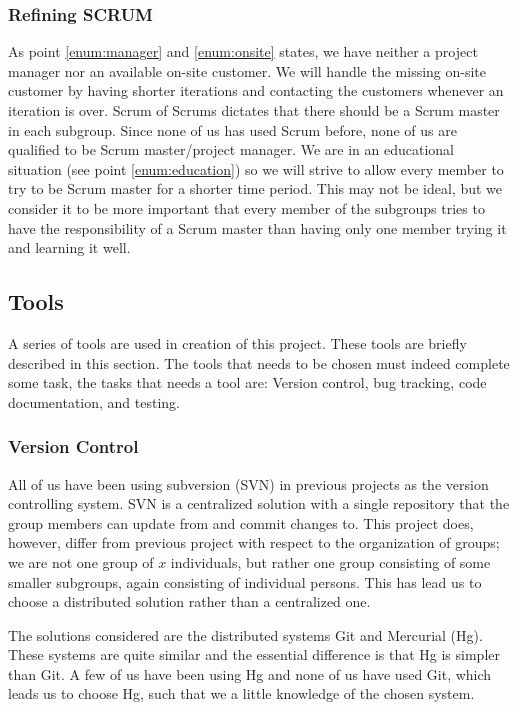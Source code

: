 \subsubsection{Refining SCRUM}
As point \ref{enum:manager} and \ref{enum:onsite} states, we have neither a project manager nor an available on-site customer.
We will handle the missing on-site customer by having shorter iterations and contacting the customers whenever an iteration is over.
Scrum of Scrums dictates that there should be a Scrum master in each subgroup.
Since none of us has used Scrum before, none of us are qualified to be Scrum master/project manager.
We are in an educational situation (see point \ref{enum:education}) so we will strive to allow every member to try to be Scrum master for a shorter time period.
This may not be ideal, but we consider it to be more important that every member of the subgroups tries to have the responsibility of a Scrum master than having only one member trying it and learning it well.

\subsection{Tools}
A series of tools are used in creation of this project.
These tools are briefly described in this section.
The tools that needs to be chosen must indeed complete some task, the tasks that needs a tool are: Version control, bug tracking, code documentation, and testing.

\subsubsection{Version Control}
All of us have been using subversion (SVN) in previous projects as the version controlling system.
SVN is a centralized solution \cite{subversion} with a single repository that the group members can update from and commit changes to.
This project does, however, differ from previous project with respect to the organization of groups; we are not one group of $x$ individuals, but rather one group consisting of some smaller subgroups, again consisting of individual persons.
This has lead us to choose a distributed solution rather than a centralized one.

The solutions considered are the distributed systems Git and Mercurial (Hg).
These systems are quite similar and the essential difference is that Hg is simpler than Git.
A few of us have been using Hg and none of us have used Git, which leads us to choose Hg, such that we a little knowledge of the chosen system.

